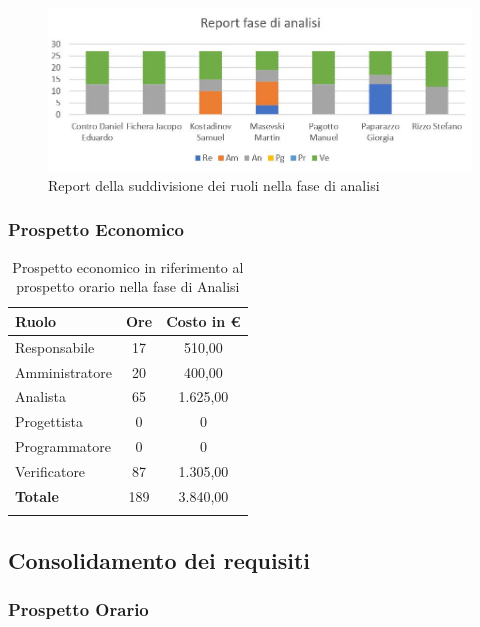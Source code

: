 \documentclass[../piano_di_progetto.tex]{subfiles}
\begin{document}
\begin{figure}[H]
\centering
\includegraphics[width=12cm]{src/img/report/report_analisi}
\caption{Report della suddivisione dei ruoli nella fase di analisi}
\end{figure}

\subsubsection{Prospetto Economico}

\begin{longtable}{|l|c|c|}
	\hline
	\rowcolor{lightgray}
	\textbf{Ruolo} & \textbf{Ore} & \textbf{Costo in €}\\
	\endhead
	\hline
	Responsabile & 17 & 510,00 \\
	Amministratore & 20 & 400,00 \\
	Analista & 65 & 1.625,00 \\
	Progettista & 0 & 0 \\
	Programmatore & 0 & 0 \\
	Verificatore & 87 & 1.305,00 \\
	\hline
	\textbf{Totale} & 189 & 3.840,00 \\
	\hline
	\rowcolor{white}
	\caption{Prospetto economico in riferimento al prospetto orario nella fase di Analisi} 
\end{longtable}

\subsection{Consolidamento dei requisiti}%
\label{sub:fase_cons}
\subsubsection{Prospetto Orario}
\end{document}
